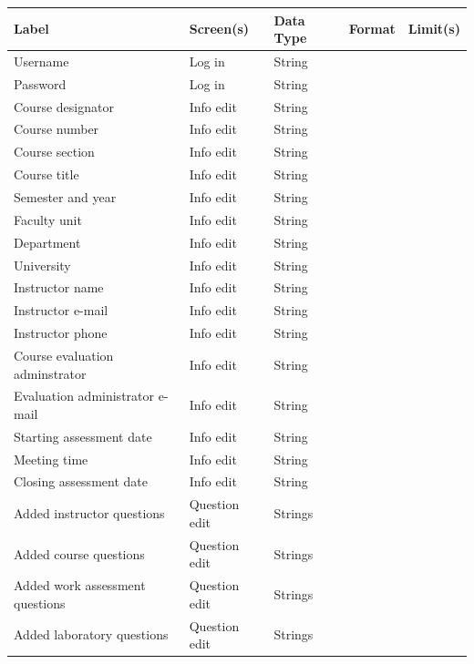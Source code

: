 \documentclass{article}
\begin{document}
\vspace{2in}

\begin{center}
\begin{tabular}{|p{4.4cm}|p{2.2cm}|p{2cm}|p{4cm}|p{4cm}|} 
\hline
\textbf{Label} & \textbf{Screen(s)} & \textbf{Data Type} & \textbf{Format} & \textbf{Limit(s)} \\
\hline
Username & Log in & String & & \\ 
\hline
Password & Log in & String & & \\ 
\hline
Course designator & Info edit & String & & \\ 
\hline
Course number & Info edit & String & & \\ 
\hline
Course section & Info edit & String & & \\ 
\hline
Course title & Info edit & String & & \\ 
\hline
Semester and year & Info edit & String & & \\ 
\hline
Faculty unit & Info edit & String & & \\ 
\hline
Department & Info edit & String & & \\ 
\hline
University & Info edit & String & & \\ 
\hline
Instructor name & Info edit & String & & \\ 
\hline
Instructor e-mail & Info edit & String & & \\ 
\hline
Instructor phone & Info edit & String & & \\ 
\hline
Course evaluation adminstrator & Info edit & String & & \\ 
\hline
Evaluation administrator e-mail & Info edit & String & & \\ 
\hline
Starting assessment date & Info edit & String & & \\ 
\hline
Meeting time & Info edit & String & & \\ 
\hline
Closing assessment date & Info edit & String & & \\ 
\hline
Added instructor questions & Question edit & Strings & & \\ 
\hline
Added course questions & Question edit & Strings & & \\ 
\hline
Added work assessment questions & Question edit & Strings & & \\ 
\hline
Added laboratory questions & Question edit & Strings & & \\ 
\hline

\end{tabular}
\end{center}
\end{document}
